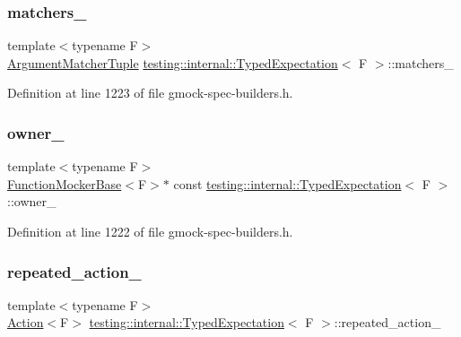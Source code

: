 \subsubsection{\texorpdfstring{matchers\+\_\+}{matchers\_}}
{\footnotesize\ttfamily template$<$typename F$>$ \\
\hyperlink{classtesting_1_1internal_1_1TypedExpectation_a8f10e3906761cc5c10fa3561c6e8938e}{Argument\+Matcher\+Tuple} \hyperlink{classtesting_1_1internal_1_1TypedExpectation}{testing\+::internal\+::\+Typed\+Expectation}$<$ F $>$\+::matchers\+\_\+\hspace{0.3cm}{\ttfamily [private]}}



Definition at line 1223 of file gmock-\/spec-\/builders.\+h.

\mbox{\label{classtesting_1_1internal_1_1TypedExpectation_ab31ce65e492f93cb7c8cd676eb64d5fa}} 
\subsubsection{\texorpdfstring{owner\+\_\+}{owner\_}}
{\footnotesize\ttfamily template$<$typename F$>$ \\
\hyperlink{classtesting_1_1internal_1_1FunctionMockerBase}{Function\+Mocker\+Base}$<$F$>$$\ast$ const \hyperlink{classtesting_1_1internal_1_1TypedExpectation}{testing\+::internal\+::\+Typed\+Expectation}$<$ F $>$\+::owner\+\_\+\hspace{0.3cm}{\ttfamily [private]}}



Definition at line 1222 of file gmock-\/spec-\/builders.\+h.

\mbox{\label{classtesting_1_1internal_1_1TypedExpectation_ac0ec406bd08a2260ede55650b3e16a62}} 
\subsubsection{\texorpdfstring{repeated\+\_\+action\+\_\+}{repeated\_action\_}}
{\footnotesize\ttfamily template$<$typename F$>$ \\
\hyperlink{classtesting_1_1Action}{Action}$<$F$>$ \hyperlink{classtesting_1_1internal_1_1TypedExpectation}{testing\+::internal\+::\+Typed\+Expectation}$<$ F $>$\+::repeated\+\_\+action\+\_\+\hspace{0.3cm}{\ttfamily [private]}}



